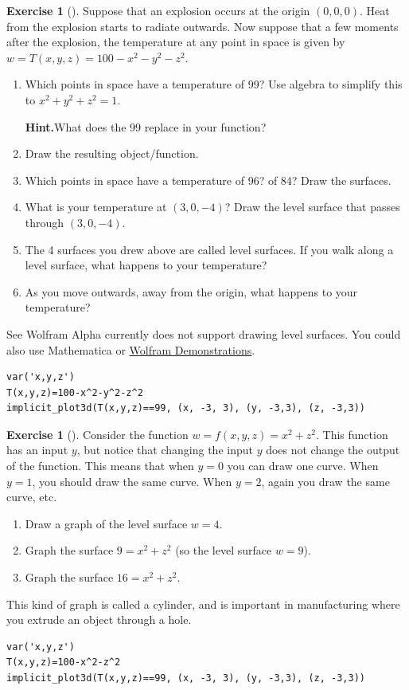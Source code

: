 \documentclass[10pt,]{book}
\theoremstyle{plain}
\theoremstyle{definition}
\theoremstyle{definition}
\theoremstyle{definition}
\theoremstyle{definition}
\newtheorem{exploration}[project]{Exercise}
\theoremstyle{definition}
\numberwithin{equation}{section}
\begin{document}
\begin{exploration}[]\label{exploration-113}
Suppose that an explosion occurs at the origin \((0,0,0)\). Heat from the explosion starts to radiate outwards. Now suppose that a few moments after the explosion, the temperature at any point in space is given by \(w=T(x,y,z)=100-x^2-y^2-z^2.\)%
\begin{enumerate}[font=\bfseries,label=(\alph*),ref=\alph*]
\item\label{task-219} Which points in space have a temperature of 99? Use algebra to simplify this to \(x^2+y^2+z^2=1\).%
\par\medskip\noindent%
\textbf{Hint.}\quad What does the 99 replace in your function?%
\item\label{task-220} Draw the resulting object/function.%
\item\label{task-221} Which points in space have a temperature of 96? of 84? Draw the surfaces.%
\item\label{task-222} What is your temperature at \((3,0,-4)\)? Draw the level surface that passes through \((3,0,-4)\).%
\item\label{task-223} The 4 surfaces you drew above are called level surfaces. If you walk along a level surface, what happens to your temperature?%
\item\label{task-224} As you move outwards, away from the origin, what happens to your temperature?%
\end{enumerate}
\bigbreak
See Wolfram Alpha currently does not support drawing level surfaces.  You could also use Mathematica or \href{http://demonstrations.wolfram.com/LevelSurfacesAndQuadraticSurfaces/}{Wolfram Demonstrations}.%
\begin{lstlisting}[style=sageinput]
var('x,y,z')
T(x,y,z)=100-x^2-y^2-z^2
implicit_plot3d(T(x,y,z)==99, (x, -3, 3), (y, -3,3), (z, -3,3))
\end{lstlisting}
\end{exploration}
\begin{exploration}[]\label{exploration-114}
Consider the function \(w=f(x,y,z)=x^2+z^2\). This function has an input \(y\), but notice that changing the input \(y\) does not change the output of the function. This means that when \(y=0\) you can draw one curve. When \(y=1\), you should draw the same curve. When \(y=2\), again you draw the same curve, etc.%
\begin{enumerate}[font=\bfseries,label=(\alph*),ref=\alph*]
\item\label{task-225} Draw a graph of the level surface \(w=4\).%
\item\label{task-226} Graph the surface \(9=x^2+z^2\) (so the level surface \(w=9\)).%
\item\label{task-227} Graph the surface \(16=x^2+z^2\).%
\end{enumerate}
\bigbreak
This kind of graph is called a cylinder, and is important in manufacturing where you extrude an object through a hole.%
\begin{lstlisting}[style=sageinput]
var('x,y,z')
T(x,y,z)=100-x^2-z^2
implicit_plot3d(T(x,y,z)==99, (x, -3, 3), (y, -3,3), (z, -3,3))
\end{lstlisting}
\end{exploration}
\end{document}
